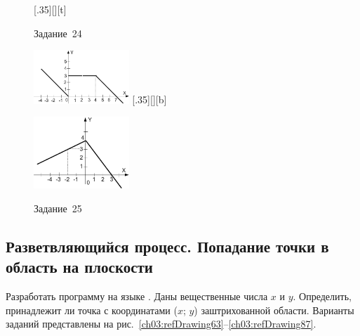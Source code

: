 \begin{figure}[h]
\begin{floatrow}
[.35\textwidth][\FBheight][t]
{\caption{Задание~24}
\label{ch03:refDrawing61}}
{\includegraphics[width=0.32\textwidth,keepaspectratio]{img/ris_3_62}}%
%
[.35\textwidth][\FBheight][b]
{\caption{Задание~25}
\label{ch03:refDrawing62}}
{\includegraphics[width=0.32\textwidth]{img/ris_3_63}}
\end{floatrow}
\end{figure}

\subsection[Разветвляющийся процесс. Попадание точки в область на плоскости]{Разветвляющийся процесс. Попадание точки в
область на плоскости}
Разработать программу на языке . Даны вещественные числа $x$ и $y$. Определить,
принадлежит ли точка с координатами ($x$; $y$) заштрихованной области.
Варианты заданий представлены на рис.~\ref{ch03:refDrawing63}--\ref{ch03:refDrawing87}.


